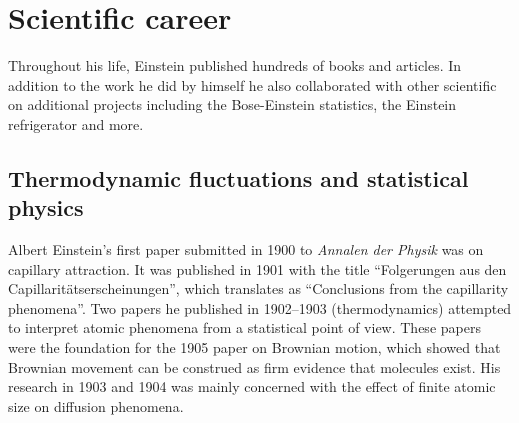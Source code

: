 \documentclass[titlepage]{article}
\begin{document}
\section{Scientific career}

Throughout his life, Einstein published hundreds of books and articles.
In addition to the work he did by himself he also collaborated with
other scientific on additional projects including the Bose-Einstein
statistics, the Einstein refrigerator and more.

\subsection{Thermodynamic fluctuations and statistical physics}

Albert Einstein's first paper submitted in 1900 to 
\emph{Annalen der Physik} was on capillary attraction. It was published
in 1901 with the title ``Folgerungen aus den
Capillarit\"{a}tserscheinungen'', which translates as ``Conclusions
from the capillarity phenomena''. Two papers he published in
1902--1903 (thermodynamics) attempted to interpret atomic phenomena
from a statistical point of view. These papers were the foundation
for the 1905 paper on Brownian motion, which showed that Brownian
movement can be construed as firm evidence that molecules exist. His
research in 1903 and 1904 was mainly concerned with the effect of
finite atomic size on diffusion phenomena.
\end{document}
